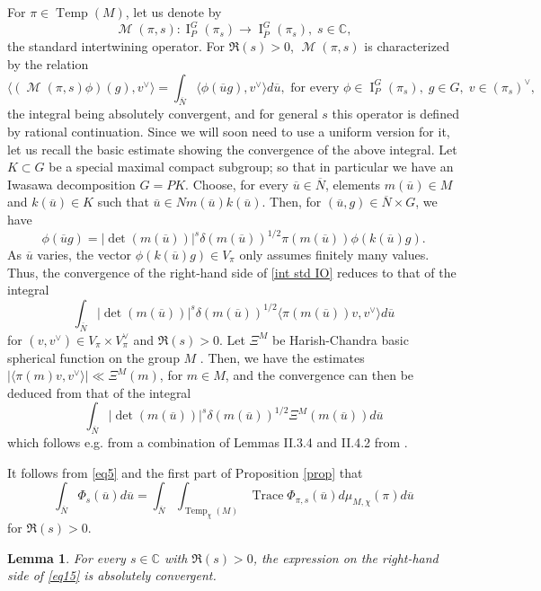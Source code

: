 \documentclass[12pt]{article}
\newtheorem{lem}{Lemma}[section]
\numberwithin{equation}{section}
\def\bC{\mathbb{C}}
\def\ou{\overline{u}}
\def\oN{\overline{N}}
\DeclareMathOperator{\Tr}{Trace}
\DeclareMathOperator{\Temp}{Temp}
\DeclareMathOperator{\cM}{\mathcal{M}}
\DeclareMathOperator{\rI}{\mathrm{I}}
\begin{document}
	For $\pi\in \Temp(M)$, let us denote by
	$$\displaystyle \cM(\pi,s): \rI_{P}^G(\pi_s)\to \rI_{\overline{P}}^G(\pi_s), \; s\in \bC,$$
	the standard intertwining operator. For $\Re(s)>0$, $\cM(\pi,s)$ is characterized by the relation
	\begin{equation}\label{int std IO}
	\displaystyle \langle (\cM(\pi,s)\phi)(g),v^\vee\rangle=\int_{\oN} \langle \phi(\ou g), v^\vee\rangle d\ou,\mbox{ for every } \phi\in \rI_{P}^G(\pi_s),\; g\in G, \; v\in (\pi_s)^\vee,
	\end{equation}
	the integral being absolutely convergent, and for general $s$ this operator is defined by rational continuation. Since we will soon need to use a uniform version for it, let us recall the basic estimate showing the convergence of the above integral. Let $K\subset G$ be a special maximal compact subgroup; so that in particular we have an Iwasawa decomposition $G=PK$. Choose, for every $\ou\in \oN$, elements $m(\ou)\in M$ and $k(\ou)\in K$ such that $\ou\in Nm(\ou)k(\ou)$. Then, for $(\ou,g)\in \oN\times G$, we have
	$$\displaystyle \phi(\ou g)=\lvert \det(m(\ou))\rvert^s \delta(m(\ou))^{1/2}\pi(m(\ou))\phi(k(\ou)g).$$
	As $\ou$ varies, the vector $\phi(k(\ou) g)\in V_\pi$ only assumes finitely many values. Thus, the convergence of the right-hand side of \eqref{int std IO} reduces to that of the integral
	$$\displaystyle \int_{\oN}  \lvert \det(m(\ou))\rvert^s \delta(m(\ou))^{1/2}\langle \pi(m(\ou))v,v^\vee\rangle d\ou$$
	for $(v,v^\vee)\in V_\pi\times V_\pi^\vee$ and $\Re(s)>0$. Let $\Xi^M$ be Harish-Chandra basic spherical function on the group $M$ \cite[\S II]{WaldPlanch}. Then, we have the estimates $\lvert \langle \pi(m)v,v^\vee\rangle\rvert\ll \Xi^M(m)$, for $m\in M$, \cite{CoHaHo} and the convergence can then be deduced from that of the integral
	\begin{equation}\label{eq20}
	\displaystyle \int_{\oN} \lvert \det(m(\ou))\rvert^s \delta(m(\ou))^{1/2} \Xi^M(m(\ou)) d\ou
	\end{equation}
	which follows e.g. from a combination of Lemmas II.3.4 and II.4.2 from \cite{WaldPlanch}.
	
	It follows from \eqref{eq5} and the first part of Proposition \ref{prop} that
	\begin{equation}\label{eq15}
	\displaystyle \int_{\oN}\Phi_{s}(\ou) d\ou=\int_{\oN} \int_{\Temp_\chi(M)} \Tr \Phi_{\pi,s}(\ou) d\mu_{M,\chi}(\pi) d\ou
	\end{equation}
for $\Re(s)>0$.

\begin{lem}\label{lem abs conv}
For every $s\in \bC$ with $\Re(s)>0$, the expression on the right-hand side of \eqref{eq15} is absolutely convergent.
\end{lem}
\end{document}

